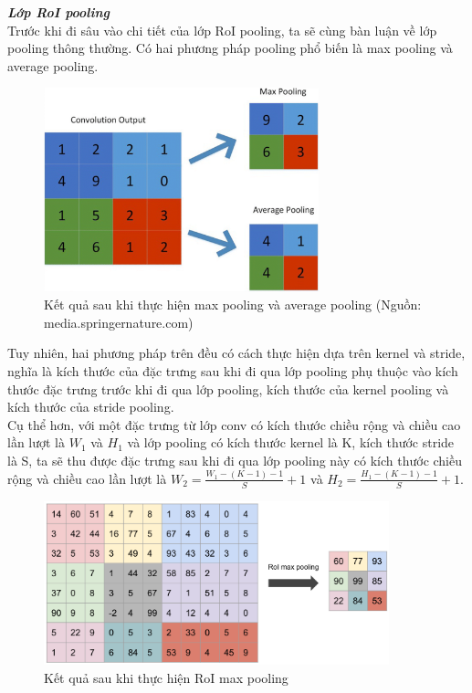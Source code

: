 {    \noindent
    \textbf{\textit{Lớp RoI pooling}} \\
    Trước khi đi sâu vào chi tiết của lớp RoI pooling, ta sẽ cùng bàn luận về lớp pooling thông thường.
    Có hai phương pháp pooling phổ biến là max pooling và average pooling.

    \begin{figure}[H]
        \centering
        \includegraphics[width=8cm] {images/pooling}
        \caption{Kết quả sau khi thực hiện max pooling và average pooling (Nguồn: media.springernature.com)}
        \label{fig:pooling}
    \end{figure}

    \noindent
    Tuy nhiên, hai phương pháp trên đều có cách thực hiện dựa trên kernel và stride, nghĩa là kích thước của đặc trưng sau khi đi qua lớp pooling phụ thuộc vào kích thước đặc trưng trước khi đi qua lớp pooling, kích thước của kernel pooling và kích thước của stride pooling. \\
    Cụ thể hơn, với một đặc trưng từ lớp conv có kích thước chiều rộng và chiều cao lần lượt là ${W}_{1}$ và ${H}_{1}$ và lớp pooling có kích thước kernel là K, kích thước stride là S, ta sẽ thu được đặc trưng sau khi đi qua lớp pooling này có kích thước chiều rộng và chiều cao lần lượt là ${W}_{2} = \frac{{W}_{1} - (K - 1) - 1}{S} + 1$ và ${H}_{2} = \frac{{H}_{1} - (K - 1) - 1}{S} + 1$.

    \begin{figure}[H]
        \centering
        \includegraphics[width=10cm] {images/roi_pooling}
        \caption{Kết quả sau khi thực hiện RoI max pooling}
        \label{fig:roi_pooling}
    \end{figure}

}
